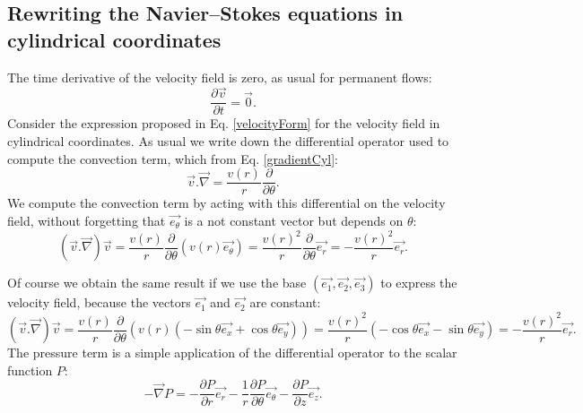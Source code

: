 \documentclass[DIV=12]{article}
\newcommand{\eBase}{(\vec{e_1}, \vec{e_2},\vec{e_3})}
\newcommand{\etheta}{\vec{e_\theta}}
\newcommand{\er}{\vec{e_r}}
\newcommand{\ez}{\vec{e_z}}
\begin{document}
\subsection{Rewriting the Navier--Stokes equations in cylindrical coordinates}
The time derivative of the velocity field is zero, as usual for permanent flows: 
\begin{equation}
\boxed{
\frac{\partial \vec{v}}{ \partial t} =\vec{0}.}
 \label{timeDerivative}
 \end{equation}
Consider the expression proposed in Eq. \ref{velocityForm} for the velocity field in cylindrical 
coordinates. As usual we write down the differential operator used to compute the convection term, 
 which from Eq. \ref{gradientCyl}:
\begin{equation}
\vec{v}.\vec{\nabla} =  \frac{v( r)}{r} \frac{\partial }{ \partial \theta }. 
\end{equation}
We compute the convection term by acting with this differential on the velocity field,
 without forgetting that $\etheta$ is a not constant vector but depends on $\theta$:
\begin{equation}
(\vec{v}.\vec{\nabla} ) \vec{v} =  \frac{v( r)}{r} \frac{\partial }{ \partial \theta }( v(r) \etheta) = \frac{v( r)^2}{r} \frac{\partial }{ \partial \theta } \er
= -\frac{v( r)^2}{r} \er.
\end{equation}

Of course we obtain the same result if we use the base $\eBase$ to express the velocity field,
 because the vectors $\vec{e_1}$ and $\vec{e_2}$ are constant:
 \begin{equation}
\boxed{
(\vec{v}.\vec{\nabla} ) \vec{v} =  \frac{v( r)}{r} \frac{\partial }{ \partial \theta }\left(v(r)( -\sin\theta \vec{e_x}+ \cos\theta \vec{e_y})\right) = \frac{v( r)^2}{r} \left(-\cos\theta \vec{e_x}-\sin\theta \vec{e_y}\right) = -\frac{v(r)^2}{r}\er.}
 \end{equation}
The pressure term is a simple application of the differential operator to the scalar function $P$:
\begin{equation}
 \boxed{
 -\vec{\nabla} P = -\frac{\partial P}{\partial r} \er - \frac{1}{r} \frac{\partial P}{\partial \theta} \etheta -  \frac{\partial P}{\partial z} \ez.
 }
\end{equation}
\end{document}

